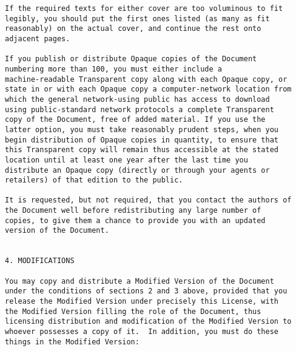\begin{verbatim}
If the required texts for either cover are too voluminous to fit
legibly, you should put the first ones listed (as many as fit
reasonably) on the actual cover, and continue the rest onto
adjacent pages.

If you publish or distribute Opaque copies of the Document
numbering more than 100, you must either include a
machine-readable Transparent copy along with each Opaque copy, or
state in or with each Opaque copy a computer-network location from
which the general network-using public has access to download
using public-standard network protocols a complete Transparent
copy of the Document, free of added material. If you use the
latter option, you must take reasonably prudent steps, when you
begin distribution of Opaque copies in quantity, to ensure that
this Transparent copy will remain thus accessible at the stated
location until at least one year after the last time you
distribute an Opaque copy (directly or through your agents or
retailers) of that edition to the public.

It is requested, but not required, that you contact the authors of
the Document well before redistributing any large number of
copies, to give them a chance to provide you with an updated
version of the Document.


4. MODIFICATIONS

You may copy and distribute a Modified Version of the Document
under the conditions of sections 2 and 3 above, provided that you
release the Modified Version under precisely this License, with
the Modified Version filling the role of the Document, thus
licensing distribution and modification of the Modified Version to
whoever possesses a copy of it.  In addition, you must do these
things in the Modified Version:


\end{verbatim}
